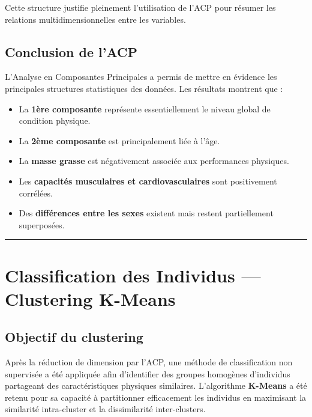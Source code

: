 \documentclass[
]{article}
\providecommand{\tightlist}{%
  \setlength{\itemsep}{0pt}\setlength{\parskip}{0pt}}
\begin{document}
Cette structure justifie pleinement l'utilisation de l'ACP pour résumer
les relations multidimensionnelles entre les variables.

\subsection{Conclusion de l'ACP}\label{conclusion-de-lacp}

L'Analyse en Composantes Principales a permis de mettre en évidence les
principales structures statistiques des données. Les résultats montrent
que :

\begin{itemize}
\tightlist
\item
  La \textbf{1ère composante} représente essentiellement le niveau
  global de condition physique.
\item
  La \textbf{2ème composante} est principalement liée à l'âge.
\item
  La \textbf{masse grasse} est négativement associée aux performances
  physiques.
\item
  Les \textbf{capacités musculaires et cardiovasculaires} sont
  positivement corrélées.
\item
  Des \textbf{différences entre les sexes} existent mais restent
  partiellement superposées.
\end{itemize}

\begin{center}\rule{0.5\linewidth}{0.5pt}\end{center}

\section{Classification des Individus --- Clustering
K-Means}\label{classification-des-individus-clustering-k-means}

\subsection{Objectif du clustering}\label{objectif-du-clustering}

Après la réduction de dimension par l'ACP, une méthode de classification
non supervisée a été appliquée afin d'identifier des groupes homogènes
d'individus partageant des caractéristiques physiques similaires.
L'algorithme \textbf{K-Means} a été retenu pour sa capacité à
partitionner efficacement les individus en maximisant la similarité
intra-cluster et la dissimilarité inter-clusters.
\end{document}
